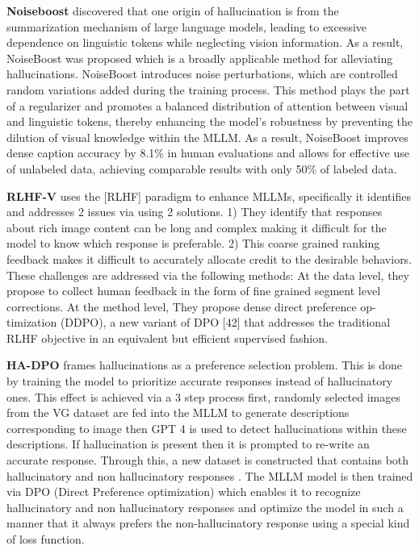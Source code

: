 \documentclass[twocolumn, 9pt]{extarticle}
\begin{document}
\textbf{Noiseboost} 
discovered that one origin of hallucination is from the summarization mechanism of large language models, leading to excessive dependence on linguistic tokens while neglecting vision information. As a result, NoiseBoost was proposed which is a broadly applicable method for alleviating hallucinations. NoiseBoost introduces noise perturbations, which are controlled random variations added during the training process. This method plays the part of a regularizer and promotes a balanced distribution of attention between visual and linguistic tokens, thereby enhancing the model's robustness by preventing the dilution of visual knowledge within the MLLM. As a result, NoiseBoost improves dense caption accuracy by 8.1\% in human evaluations and allows for effective use of unlabeled data, achieving comparable results with only 50\% of labeled data. 


\textbf{RLHF-V}  uses the [RLHF] paradigm to enhance MLLMs, specifically it identifies and addresses 2 issues via using 2 solutions. 1) They identify that responses about rich image content can be long and complex making it difficult for the model to know which response is preferable. 2) This coarse grained ranking feedback makes it difficult to accurately allocate credit to the desirable behaviors. These challenges are addressed via the following methods:
At the data level, they propose to collect human feedback in the form of fine grained segment level corrections.
At the method level, They propose dense direct preference op- timization (DDPO), a new variant of DPO [42] that addresses the traditional RLHF objective in an equivalent but efficient supervised fashion.

\textbf{HA-DPO}  frames hallucinations as a preference selection problem. This is done by training the model to prioritize accurate responses instead of hallucinatory ones. This effect is achieved via a 3 step process first, randomly selected images from the VG dataset are fed into the MLLM to generate descriptions corresponding to image then GPT 4 is used to detect hallucinations within these descriptions. If hallucination is present then it is prompted to re-write an accurate response. Through this, a new dataset is constructed that contains both hallucinatory and non hallucinatory responses . The MLLM model is then trained via DPO (Direct Preference optimization) which enables it to recognize hallucinatory and non hallucinatory responses and optimize the model in such a manner that it always prefers the non-hallucinatory response using a special kind of loss function. 
\end{document}
